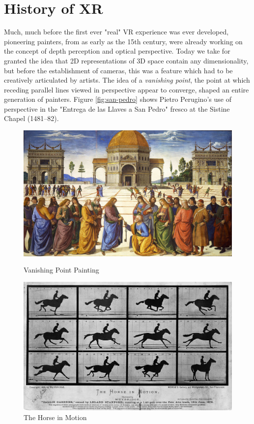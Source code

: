 \section{History of XR}

Much, much before the first ever "real" VR experience was ever developed, pioneering painters, from as early as the 15th century, were already working on the concept of depth perception and optical perspective. Today we take for granted the idea that 2D representations of 3D space contain any dimensionality, but before the establishment of cameras, this was a feature which had to be creatively articulated by artists. The idea of a \textit{vanishing point}, the point at which receding parallel lines viewed in perspective appear to converge, shaped an entire generation of painters. Figure \ref{fig:san-pedro} shows Pietro Perugino's use of perspective in the "Entrega de las Llaves a San Pedro" fresco at the Sistine Chapel (1481–82).

\begin{figure}[!htb]
  \includegraphics[width=\linewidth]{img/perugino.jpg}
  \caption{Vanishing Point Painting \cite{FileEntr24online}}\label{fig:san-pedro}
\endminipage\hfill
{}
  \includegraphics[width=\linewidth]{img/horse-in-mot.jpg}
  \caption{The Horse in Motion \cite{FileTheH64online}}\label{fig:horse-motion}
\endminipage
\end{figure}


